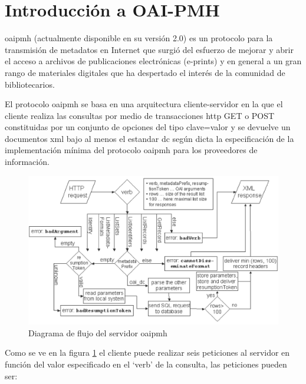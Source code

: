 \section{Introducción a OAI-PMH}

\acrfull{oaipmh} (actualmente disponible en su versión 2.0) es un protocolo para la transmisión de metadatos en Internet que surgió del esfuerzo de mejorar y abrir el acceso a archivos de publicaciones electrónicas (e-prints) y en general a un gran rango de materiales digitales que ha despertado el interés de la comunidad de bibliotecarios.\cite{JM_OAI}

El protocolo \acrshort{oaipmh} se basa en una arquitectura cliente-servidor en la que el cliente realiza las consultas por medio de transacciones \acrshort{http} GET o POST constituidas por un conjunto de opciones del tipo clave=valor y se devuelve un documentos \acrshort{xml} bajo al menos el estandar \acrfull{dc} según dicta la especificación de la implementación mínima del protocolo \acrshort{oaipmh} para los proveedores de información.\cite{OAIPMH_implementers}

\begin{figure}[!htp]
	\centering
	\includegraphics[scale=.15]{fig/oai_flow}
	\caption{Diagrama de flujo del servidor \acrshort{oaipmh}}\label{fig:oaiflow}
\end{figure}

Como se ve en la figura \ref{fig:oaiflow} el cliente puede realizar seis peticiones al servidor en función del valor especificado en el `verb' de la consulta, las peticiones pueden ser:

